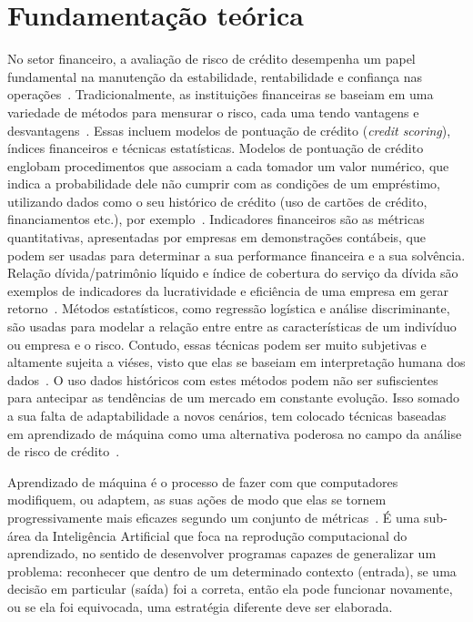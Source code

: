 \chapter{Fundamentação teórica}\label{cap:fundamentacao-teorica}

No setor financeiro, a avaliação de risco de crédito desempenha um papel fundamental na manutenção da estabilidade, rentabilidade e confiança nas operações~\cite{Chakraborty2020}. Tradicionalmente, as instituições financeiras se baseiam em uma variedade de métodos para mensurar o risco, cada uma tendo vantagens e desvantagens~\cite{Bello2023}. Essas incluem modelos de pontuação de crédito (\textit{credit scoring}), índices financeiros e técnicas estatísticas. Modelos de pontuação de crédito englobam procedimentos que associam a cada tomador um valor numérico, que indica a probabilidade dele não cumprir com as condições de um empréstimo, utilizando dados como o seu histórico de crédito (uso de cartões de crédito, financiamentos etc.), por exemplo~\cite{Pang2021}. Indicadores financeiros são as métricas quantitativas, apresentadas por empresas em demonstrações contábeis, que podem ser usadas para determinar a sua performance financeira e a sua solvência. Relação dívida/patrimônio líquido e índice de cobertura do serviço da dívida são exemplos de indicadores da lucratividade e eficiência de uma empresa em gerar retorno~\cite{Coulon2019}. Métodos estatísticos, como regressão logística e análise discriminante, são usadas para modelar a relação entre entre as características de um indivíduo ou empresa e o risco. Contudo, essas técnicas podem ser muito subjetivas e altamente sujeita a viéses, visto que elas se baseiam em interpretação humana dos dados~\cite{Goel2021}. O uso dados históricos com estes métodos podem não ser sufiscientes para antecipar as tendências de um mercado em constante evolução. Isso somado a sua falta de adaptabilidade a novos cenários, tem colocado técnicas baseadas em aprendizado de máquina como uma alternativa poderosa no campo da análise de risco de crédito~\cite{Mhlanga2021}.

Aprendizado de máquina é o processo de fazer com que computadores modifiquem, ou adaptem, as suas ações de modo que elas se tornem progressivamente mais eficazes segundo um conjunto de métricas~\cite{StephenMarsland2014}. É uma sub-área da Inteligência Artificial que foca na reprodução computacional do aprendizado, no sentido de desenvolver programas capazes de generalizar um problema: reconhecer que dentro de um determinado contexto (entrada), se uma decisão em particular (saída) foi a correta, então ela pode funcionar novamente, ou se ela foi equivocada, uma estratégia diferente deve ser elaborada.

